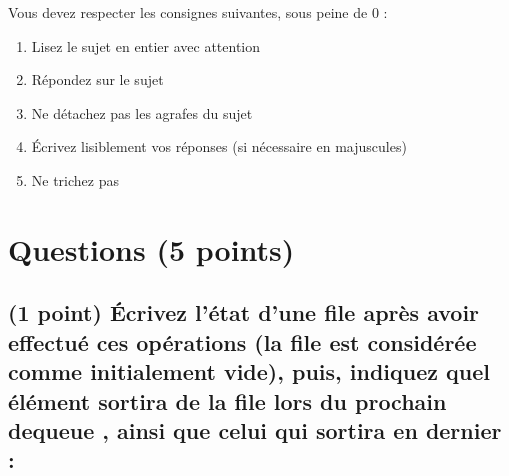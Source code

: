 \documentclass[11pt,a4paper]{article}
\begin{document}
\MakeExamTitle                   %


\bigskip

Vous devez respecter les consignes suivantes, sous peine de 0 :

\begin{enumerate}[label=\Roman*)]
\item Lisez le sujet en entier avec attention
\item Répondez sur le sujet
\item Ne détachez pas les agrafes du sujet
\item \'Ecrivez lisiblement vos réponses (si nécessaire en majuscules)
\item Ne trichez pas
\end{enumerate}


\vfillFirst

\section{Questions (5 points)}

\subsection{(1 point) \'Ecrivez l'état d'une file après avoir effectué ces opérations (la file est considérée comme initialement vide), puis, indiquez quel élément sortira de la file lors du prochain \og dequeue \fg{}, ainsi que celui qui sortira en dernier : }

\bigskip
\end{document}
